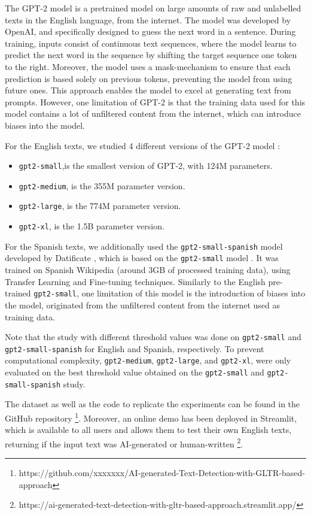 \documentclass[a4paper,11pt,twocolumn,twoside]{article}
\begin{document}
The GPT-2 model is a pretrained model on large amounts of raw and unlabelled texts in the English language, from the internet. The model was developed by OpenAI, and specifically designed to guess the next word in a sentence. During training, inputs consist of continuous text sequences, where the model learns to predict the next word in the sequence by shifting the target sequence one token to the right.
Moreover, the model uses a mask-mechanism to ensure that each prediction is based solely on previous tokens, preventing the model from using future ones. This approach enables the model to excel at generating text from prompts.
However, one limitation of GPT-2 is that the training data used for this model contains a lot of unfiltered content from the internet, which can introduce biases into the model.

For the English texts, we studied 4 different versions of the GPT-2 model \cite{radford2019language}: 
\begin{itemize}
    \item \texttt{gpt2-small},is the smallest version of GPT-2, with 124M parameters.
    
    \item \texttt{gpt2-medium}, is the 355M parameter version.
    \item \texttt{gpt2-large}, is the 774M parameter version.
    \item \texttt{gpt2-xl}, is the 1.5B parameter version.
\end{itemize}

For the Spanish texts, we additionally used the \texttt{gpt2-small-spanish} model developed by Datificate \cite{datificate}, which is based on the \texttt{gpt2-small} model \cite{radford2019language}.
It was trained on Spanish Wikipedia (around 3GB of processed training data), using Transfer Learning and Fine-tuning techniques. Similarly to the English pre-trained \texttt{gpt2-small}, one limitation of this model is the introduction of biases into the model, originated from the unfiltered content from the internet used as training data.

Note that the study with different threshold values was done on \texttt{gpt2-small} and \texttt{gpt2-small-spanish} for English and Spanish, respectively. To prevent computational complexity, \texttt{gpt2-medium}, \texttt{gpt2-large}, and \texttt{gpt2-xl}, were only evaluated on the best threshold value obtained on the \texttt{gpt2-small} and \texttt{gpt2-small-spanish} study.

The dataset as well as the code to replicate the experiments can be found in the GitHub repository \footnote{https://github.com/xxxxxxx/AI-generated-Text-Detection-with-GLTR-based-approach}. Moreover, an online demo has been deployed in Streamlit, which is available to all users and allows them to test their own English texts, returning if the input text was AI-generated or human-written \footnote{https://ai-generated-text-detection-with-gltr-based-approach.streamlit.app/}.
\end{document}
